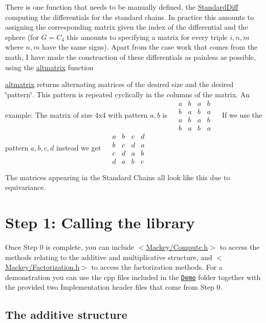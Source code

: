 \begin{DoxyItemize}
\item There is one function that needs to be manually defined, the \hyperlink{classGroupSpecific_1_1Function_a8ead55e2f2e2bbda4deea3964793498d}{Standard\+Diff} computing the differentials for the standard chains. In practice this amounts to assigning the corresponding matrix given the index of the differential and the sphere (for $G=C_4$ this amounts to specifying a matrix for every triple $i,n,m$ where $n,m$ have the same signs). Apart from the case work that comes from the math, I have made the construction of these differentials as painless as possible, using the \hyperlink{namespaceMackey_a26a529f63caac9c5b4dc809e0e5831be}{altmatrix} function
\item \hyperlink{namespaceMackey_a26a529f63caac9c5b4dc809e0e5831be}{altmatrix} returns alternating matrices of the desired size and the desired \char`\"{}pattern\char`\"{}. This pattern is repeated cyclically in the columns of the matrix. An example\+: The matrix of size 4x4 with pattern $a,b$ is ~\newline
 $\begin{matrix} a&b&a&b\\ b&a&b&a\\ a&b&a&b \\ b&a&b&a \end{matrix}$ ~\newline
 If we use the pattern $a,b,c,d$ instead we get ~\newline
 $\begin{matrix} a&b&c&d\\ b&c&d&a\\ c&d&a&b \\ d&a&b&c \end{matrix}$ ~\newline

\item The matrices appearing in the Standard Chains all look like this due to equivariance.
\end{DoxyItemize}\hypertarget{use_next}{}\section{Step 1\+: Calling the library}\label{use_next}
Once Step 0 is complete, you can include {\ttfamily $<$\hyperlink{Compute_8h}{Mackey/\+Compute.\+h}$>$} to access the methods relating to the additive and multiplicative structure, and {\ttfamily $<$\hyperlink{Factorization_8h}{Mackey/\+Factorization.\+h}$>$} to access the factorization methods. For a demonstration you can use the cpp files included in the \href{https://github.com/NickG-Math/Mackey/tree/master/Demo}{\tt Demo} folder together with the provided two Implementation header files that come from Step 0.\hypertarget{use_step1add}{}\subsection{The additive structure}\label{use_step1add}
